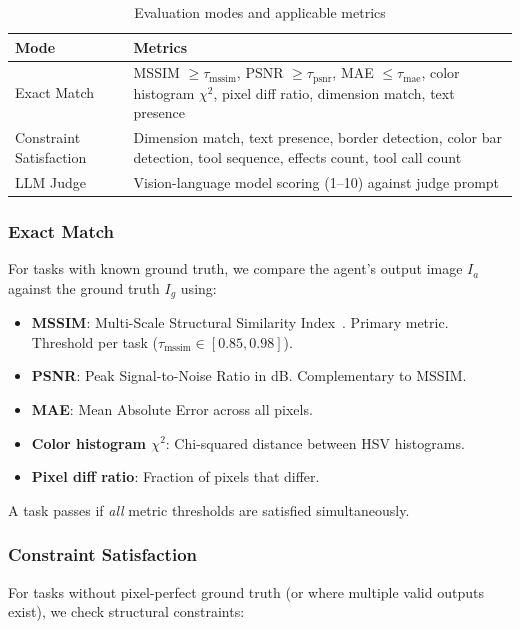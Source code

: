 \documentclass[11pt,a4paper]{article}
\begin{document}
\begin{table}[h]
\centering
\caption{Evaluation modes and applicable metrics}
\label{tab:eval_modes}
\begin{tabular}{lp{8cm}}
\toprule
\textbf{Mode} & \textbf{Metrics} \\
\midrule
Exact Match & MSSIM $\geq \tau_\text{mssim}$, PSNR $\geq \tau_\text{psnr}$, MAE $\leq \tau_\text{mae}$, color histogram $\chi^2$, pixel diff ratio, dimension match, text presence \\
Constraint Satisfaction & Dimension match, text presence, border detection, color bar detection, tool sequence, effects count, tool call count \\
LLM Judge & Vision-language model scoring (1--10) against judge prompt \\
\bottomrule
\end{tabular}
\end{table}

\subsubsection{Exact Match}

For tasks with known ground truth, we compare the agent's output image $I_a$ against the ground truth $I_g$ using:

\begin{itemize}
    \item \textbf{MSSIM}: Multi-Scale Structural Similarity Index~\citep{SSIM}. Primary metric. Threshold per task ($\tau_\text{mssim} \in [0.85, 0.98]$).
    \item \textbf{PSNR}: Peak Signal-to-Noise Ratio in dB. Complementary to MSSIM.
    \item \textbf{MAE}: Mean Absolute Error across all pixels.
    \item \textbf{Color histogram $\chi^2$}: Chi-squared distance between HSV histograms.
    \item \textbf{Pixel diff ratio}: Fraction of pixels that differ.
\end{itemize}

A task passes if \emph{all} metric thresholds are satisfied simultaneously.

\subsubsection{Constraint Satisfaction}

For tasks without pixel-perfect ground truth (or where multiple valid outputs exist), we check structural constraints:
\end{document}
